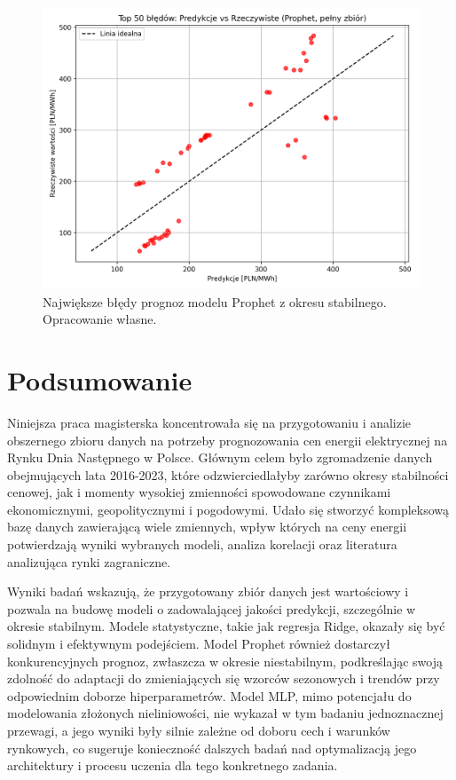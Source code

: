 \begin{figure}[H]
    \centering
    \includegraphics[width=1.0\textwidth]{../plots/predicts/top_50_errors_Prophet_full_stable_period.png}
    \caption{Największe błędy prognoz modelu Prophet z okresu stabilnego. Opracowanie własne.}
    \label{fig:top_50_errors_Prophet_full_stable_period}
\end{figure}

\section{Podsumowanie}
\label{sec:podsumowanie}

Niniejsza praca magisterska koncentrowała się na przygotowaniu i analizie obszernego zbioru danych na potrzeby prognozowania cen energii elektrycznej na Rynku Dnia Następnego w Polsce. Głównym celem było zgromadzenie danych obejmujących lata 2016-2023, które odzwierciedlałyby zarówno okresy stabilności cenowej, jak i momenty wysokiej zmienności spowodowane czynnikami ekonomicznymi, geopolitycznymi i pogodowymi. Udało się stworzyć kompleksową bazę danych zawierającą wiele zmiennych, wpływ których na ceny energii potwierdzają wyniki wybranych modeli, analiza korelacji oraz literatura analizująca rynki zagraniczne.

Wyniki badań wskazują, że przygotowany zbiór danych jest wartościowy i pozwala na budowę modeli o zadowalającej jakości predykcji, szczególnie w okresie stabilnym. Modele statystyczne, takie jak regresja Ridge, okazały się być solidnym i efektywnym podejściem. Model Prophet również dostarczył konkurencyjnych prognoz, zwłaszcza w okresie niestabilnym, podkreślając swoją zdolność do adaptacji do zmieniających się wzorców sezonowych i trendów przy odpowiednim doborze hiperparametrów. Model MLP, mimo potencjału do modelowania złożonych nieliniowości, nie wykazał w tym badaniu jednoznacznej przewagi, a jego wyniki były silnie zależne od doboru cech i warunków rynkowych, co sugeruje konieczność dalszych badań nad optymalizacją jego architektury i procesu uczenia dla tego konkretnego zadania.

